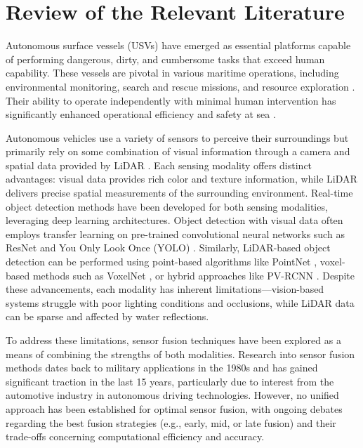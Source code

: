 \documentclass{erauthesis}
\begin{document}
\chapter{Review of the Relevant Literature}


Autonomous surface vessels (USVs) have emerged as essential platforms capable of performing dangerous, dirty, and cumbersome tasks that exceed human capability. These vessels are pivotal in various maritime operations, including environmental monitoring, search and rescue missions, and resource exploration \cite{liebergall, eckstein2024}.%
Their ability to operate independently with minimal human intervention has significantly enhanced operational efficiency and safety at sea \cite{bai2022}.%

Autonomous vehicles use a variety of sensors to perceive their surroundings but primarily rely on some combination of visual information through a camera and spatial data provided by LiDAR \cite{yeong2021}.%
Each sensing modality offers distinct advantages: visual data provides rich color and texture information, while LiDAR delivers precise spatial measurements of the surrounding environment. 
Real-time object detection methods have been developed for both sensing modalities, leveraging deep learning architectures. 
Object detection with visual data often employs transfer learning on pre-trained convolutional neural networks such as ResNet \cite{he2016} and You Only Look Once (YOLO) \cite{ultralytics}.%
Similarly, LiDAR-based object detection can be performed using point-based algorithms like PointNet \cite{garcia-garcia2016}, voxel-based methods such as VoxelNet \cite{zhou2018a}, or hybrid approaches like PV-RCNN \cite{shi2021}.%
Despite these advancements, each modality has inherent limitations—vision-based systems struggle with poor lighting conditions and occlusions, while LiDAR data can be sparse and affected by water reflections.

To address these limitations, sensor fusion techniques have been explored as a means of combining the strengths of both modalities. 
Research into sensor fusion methods dates back to military applications in the 1980s and has gained significant traction in the last 15 years, particularly due to interest from the automotive industry in autonomous driving technologies. However, no unified approach has been established for optimal sensor fusion, with ongoing debates regarding the best fusion strategies (e.g., early, mid, or late fusion) and their trade-offs concerning computational efficiency and accuracy.
\end{document}
